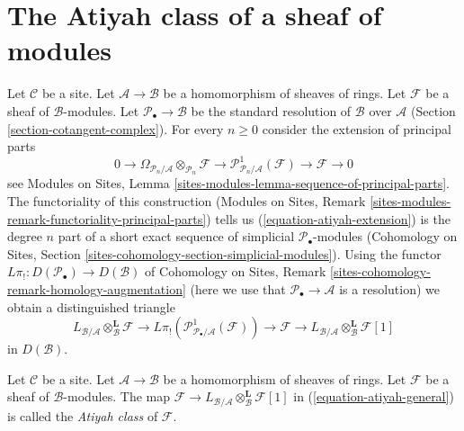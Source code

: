 










\section{The Atiyah class of a sheaf of modules}
\label{section-atiyah-general}

\noindent
Let $\mathcal{C}$ be a site. Let $\mathcal{A} \to \mathcal{B}$ be a
homomorphism of sheaves of rings. Let $\mathcal{F}$ be a
sheaf of $\mathcal{B}$-modules. Let $\mathcal{P}_\bullet \to \mathcal{B}$
be the standard resolution of $\mathcal{B}$ over $\mathcal{A}$
(Section \ref{section-cotangent-complex}).
For every $n \geq 0$ consider the extension of principal parts
\begin{equation}
\label{equation-atiyah-extension}
0 \to
\Omega_{\mathcal{P}_n/\mathcal{A}} \otimes_{\mathcal{P}_n} \mathcal{F} \to
\mathcal{P}^1_{\mathcal{P}_n/\mathcal{A}}(\mathcal{F}) \to
\mathcal{F} \to 0
\end{equation}
see
Modules on Sites, Lemma \ref{sites-modules-lemma-sequence-of-principal-parts}.
The functoriality of this construction
(Modules on Sites, Remark
\ref{sites-modules-remark-functoriality-principal-parts})
tells us (\ref{equation-atiyah-extension}) is the degree $n$ part of
a short exact sequence of simplicial $\mathcal{P}_\bullet$-modules
(Cohomology on Sites, Section
\ref{sites-cohomology-section-simplicial-modules}).
Using the functor $L\pi_! : D(\mathcal{P}_\bullet) \to D(\mathcal{B})$
of Cohomology on Sites, Remark
\ref{sites-cohomology-remark-homology-augmentation}
(here we use that $\mathcal{P}_\bullet \to \mathcal{A}$ is a resolution)
we obtain a distinguished triangle
\begin{equation}
\label{equation-atiyah-general}
L_{\mathcal{B}/\mathcal{A}} \otimes_\mathcal{B}^\mathbf{L} \mathcal{F} \to
L\pi_!\left(\mathcal{P}^1_{\mathcal{P}_\bullet/\mathcal{A}}(\mathcal{F})\right)
\to \mathcal{F} \to
L_{\mathcal{B}/\mathcal{A}} \otimes_\mathcal{B}^\mathbf{L} \mathcal{F} [1]
\end{equation}
in $D(\mathcal{B})$.

\begin{definition}
\label{definition-atiyah-class-general}
Let $\mathcal{C}$ be a site.
Let $\mathcal{A} \to \mathcal{B}$ be a homomorphism of sheaves of rings.
Let $\mathcal{F}$ be a sheaf of $\mathcal{B}$-modules.
The map $\mathcal{F} \to
L_{\mathcal{B}/\mathcal{A}} \otimes_\mathcal{B}^\mathbf{L} \mathcal{F}[1]$
in (\ref{equation-atiyah-general}) is called the {\it Atiyah class} of
$\mathcal{F}$.
\end{definition}









